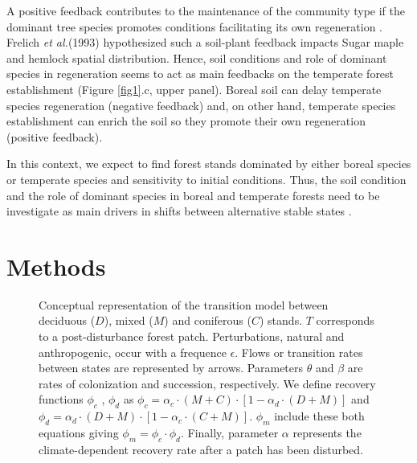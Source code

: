 A positive feedback contributes to the maintenance of the community type if
the dominant tree species promotes conditions facilitating its own
regeneration \cite{Barras1998}. Frelich \textit{et al.}(1993)
\cite{Society2014} hypothesized such a soil-plant feedback impacts Sugar maple
and hemlock spatial distribution. Hence, soil conditions and role of dominant
species in regeneration seems to act as main feedbacks on the temperate forest
establishment (Figure \ref{fig1}.c, upper panel). Boreal soil can delay
temperate species regeneration (negative feedback) and, on other hand,
temperate species establishment can enrich the soil so they promote their own
regeneration (positive feedback).


In this context, we expect to find forest stands dominated by either boreal
species or temperate species and sensitivity to initial conditions. Thus, the
soil condition and the role of dominant species in boreal and temperate
forests need to be investigate as main drivers in shifts between alternative
stable states \cite{Kellman2004,Moore2008,DeFrenne2013,Barras1998}.


\section{Methods}   

\begin{figure}
	
	\caption{Conceptual representation of the transition model between deciduous ($D$),
	mixed ($M$) and coniferous ($C$) stands. $T$ corresponds to a post-disturbance forest patch. Perturbations, natural and anthropogenic, occur with a frequence $\epsilon$. 
	Flows or transition rates between states are represented by arrows.
	Parameters $\theta$ and $\beta$ are rates of colonization and succession,
	respectively. We define recovery functions $\phi_c$ , $\phi_d$ as $\phi_c
	= \alpha_c \cdot (M+C) \cdot [1- \alpha_d \cdot (D+M)]$ and $\phi_d =
	\alpha_d \cdot (D+M) \cdot [1- \alpha_c \cdot (C+M)]$. $\phi_m$ include these both equations giving $\phi_m = \phi_c \cdot \phi_d$. Finally, parameter $\alpha$ represents the climate-dependent recovery rate after a patch has been disturbed.}
	\label{Model}
	\vspace{-1em}
\end{figure}


